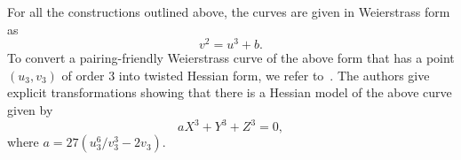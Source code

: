 


For all the constructions outlined above,
the curves are given in Weierstrass form as
\[v^2 = u^3 + b.\]
To convert a pairing-friendly Weierstrass curve of the above form
that has a point $(u_3,v_3)$ of order 3
into twisted Hessian form, we refer to~\cite{2015/hessian}.
The authors give explicit transformations showing that there is a Hessian model of the above curve given by
\[aX^3 + Y^3 + Z^3 = 0,\]
where
$a = 27(u_3^6/v_3^3-2v_3)$.
%
%
%
